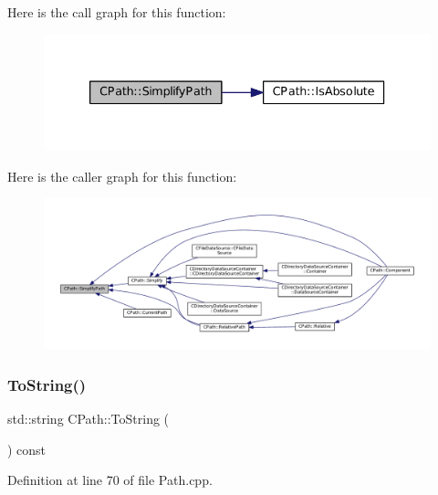 Here is the call graph for this function\+:
\nopagebreak
\begin{figure}[H]
\begin{center}
\leavevmode
\includegraphics[width=333pt]{classCPath_af0213a2ea0de0498ded236137e759922_cgraph}
\end{center}
\end{figure}
Here is the caller graph for this function\+:
\nopagebreak
\begin{figure}[H]
\begin{center}
\leavevmode
\includegraphics[width=350pt]{classCPath_af0213a2ea0de0498ded236137e759922_icgraph}
\end{center}
\end{figure}
\hypertarget{classCPath_abbafaf377a7e38e0151bd9567d526951}{}\label{classCPath_abbafaf377a7e38e0151bd9567d526951} 
\subsubsection{\texorpdfstring{To\+String()}{ToString()}}
{\footnotesize\ttfamily std\+::string C\+Path\+::\+To\+String (\begin{DoxyParamCaption}{ }\end{DoxyParamCaption}) const}



Definition at line 70 of file Path.\+cpp.


